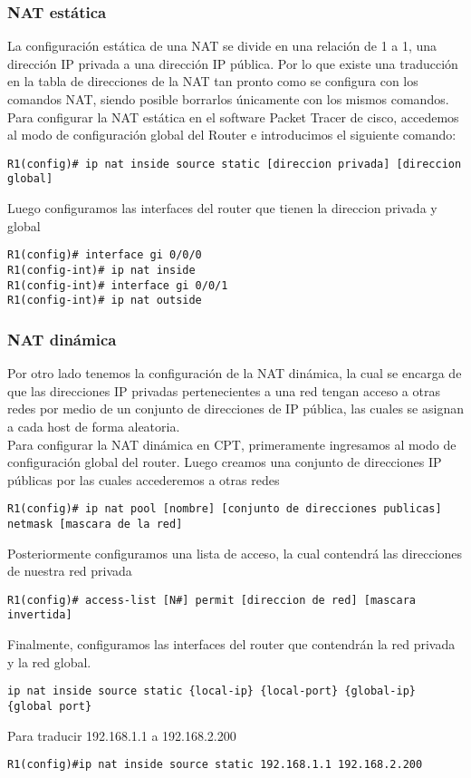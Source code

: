 \documentclass[
	12pt, %
	fleqn, %
	a4paper, %
	oneside, %
]{LegrandOrangeBook}
\begin{document}
\subsubsection{NAT estática}
La configuración estática de una NAT se divide en una relación de 1 a 1, una dirección IP privada a una dirección IP pública. Por lo que existe una traducción en la tabla de direcciones de la NAT tan pronto como se configura con los comandos NAT, siendo posible borrarlos únicamente con los mismos comandos.
Para configurar la NAT estática en el software Packet Tracer de cisco, accedemos al modo de configuración global del Router e introducimos el siguiente comando:
\begin{lstlisting}[numbers=none]
R1(config)# ip nat inside source static [direccion privada] [direccion global]
\end{lstlisting}
Luego configuramos las interfaces del router que tienen la direccion privada y global
\begin{lstlisting}[numbers=none]
R1(config)# interface gi 0/0/0
R1(config-int)# ip nat inside
R1(config-int)# interface gi 0/0/1
R1(config-int)# ip nat outside
\end{lstlisting}
\subsubsection{NAT dinámica}
Por otro lado tenemos la configuración de la NAT dinámica, la cual se encarga de que las direcciones IP privadas pertenecientes a una red tengan acceso a otras redes por medio de un conjunto de direcciones de IP pública, las cuales se asignan a cada host de forma aleatoria.\\
Para configurar la NAT dinámica en CPT, primeramente ingresamos al modo de configuración global del router. Luego creamos una conjunto de direcciones IP públicas por las cuales accederemos a otras redes
\begin{lstlisting}[numbers=none]
R1(config)# ip nat pool [nombre] [conjunto de direcciones publicas] netmask [mascara de la red]
\end{lstlisting}
Posteriormente configuramos una lista de acceso, la cual contendrá las direcciones de nuestra red privada
\begin{lstlisting}[numbers=none]
R1(config)# access-list [N#] permit [direccion de red] [mascara invertida]
\end{lstlisting}
Finalmente, configuramos las interfaces del router que contendrán la red privada y la red global.
\begin{lstlisting}[numbers=none]
ip nat inside source static {local-ip} {local-port} {global-ip} {global port}
\end{lstlisting}
Para traducir 192.168.1.1 a 192.168.2.200
\begin{lstlisting}[numbers=none]
R1(config)#ip nat inside source static 192.168.1.1 192.168.2.200
\end{lstlisting}
\end{document}
